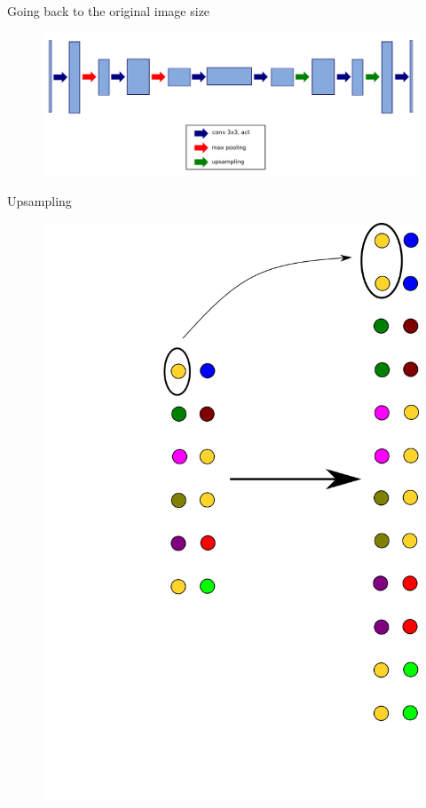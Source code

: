 \documentclass[xcolor=pdftex,dvipsnames,table,mathserif]{beamer}
\begin{document}
\begin{frame}{Going back to the original image size}

    \begin{figure}
      \includegraphics[width=\textwidth]{going_back.png}
    \end{figure}

\end{frame}


\begin{frame}{Upsampling}

    \begin{figure}
      \includegraphics[height=\textheight]{upsampling.png}
    \end{figure}


\end{frame}
\end{document}
